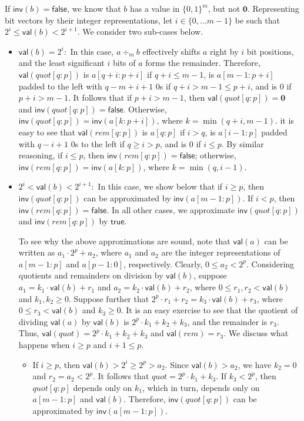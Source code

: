 \documentclass{llncs}
\newcommand{\val}{\ensuremath{\mathsf{val}}}
\newcommand{\inv}{\ensuremath{\mathsf{inv}}}
\newcommand{\true}{\ensuremath{\mathsf{true}}}
\newcommand{\false}{\ensuremath{\mathsf{false}}}
\begin{document}
If ${\inv}(b) = \false$, we know that $b$ has a value in $\{0,
1\}^{m}$, but not $\mathbf{0}$.  Representing bit vectors by their
integer representations, let $i \in \{0, \ldots m-1\}$ be such that
$2^i \le {\val}(b) < 2^{i+1}$.  We consider two
sub-cases below.
\begin{itemize}
\item ${\val}(b) = 2^i :$ In this case, $a \div_m b$ effectively
  shifts $a$ right by $i$ bit positions, and the least significant $i$
  bits of $a$ forms the remainder.
  Therefore, ${\val}(quot[q:p])$ is $a[q+i:p+i]$ if $q+i \le
  m-1$, is $a[m-1:p+i]$ padded to the left with $q-m+i+1$ $0$s if $q+i
  > m-1 \le p+i$, and is $0$ if $p+i > m-1$.
  It follows that if $p+i > m-1$, then ${\val}(quot[q:p]) = {\mathbf 0}$
  and ${\inv}(quot[q:p]) = \false$.  Otherwise, ${\inv}(quot[q:p]) =
  {\inv}(a[k:p+i])$, where $k = \min(q+i, m-1)$.
it is easy to see that ${\val}(rem[q:p])$ is
$a[q:p]$ if $i > q$, is $a[i-1:p]$ padded with $q-i+1$ $0$s to the
left if $q \ge i > p$, and is $0$ if $i \le p$.  
  By similar reasoning, if $i \le p$, then
${\inv}(rem[q:p]) = \false$;  otherwise, ${\inv}(rem[q:p]) =
{\inv}(a[k:p])$, where $k = \min(q, i-1)$.
\item $2^i < {\val}(b) < 2^{i+1} :$ In this case, we show below that
  if $i \ge p$, then ${\inv}(quot[q:p])$ can be approximated
  by ${\inv}(a[m-1:p])$.  If $i < p$, then ${\inv}(rem[q:p]) =
  \false$.  In all other cases, we approximate ${\inv}(quot[q:p])$ and
  ${\inv}(rem[q:p])$ by $\true$.

  To see why the above approximations are sound, note that
  ${\val}(a)$ can be written as $a_1\cdot 2^p + a_2$, where $a_1$ and
  $a_2$ are the integer representations of $a[m-1:p]$ and $a[p-1:0]$,
  respectively.  Clearly, $0 \le a_2 < 2^p$.  Considering quotients
  and remainders on division by ${\val}(b)$, suppose $a_1 = k_1\cdot
  {\val}(b) + r_1$ and $a_2 = k_2\cdot {\val}(b) + r_2$, where $0 \le
  r_1, r_2 < {\val}(b)$ and $k_1, k_2 \ge 0$.  Suppose further that
  $2^p\cdot r_1 + r_2 = k_3\cdot {\val}(b) + r_3$, where $0 \le r_3 <
  {\val}(b)$ and $k_3 \ge 0$.  It is an easy exercise to see that the
  quotient of dividing ${\val}(a)$ by ${\val}(b)$ is $2^p\cdot k_1 +
  k_2 + k_3$, and the remainder is $r_3$.  Thus, ${\val}(quot) =
  2^p\cdot k_1 + k_2 + k_3$ and ${\val}(rem) = r_3$.  We discuss what
  happens when $i \ge p$ and $i+1 \le p$.
  \begin{itemize}
    \item If $i \ge p$, then ${\val}(b) > 2^i \ge 2^p > a_2$.  Since
      ${\val}(b) > a_2$, we have $k_2 = 0$ and $r_2 = a_2 < 2^p$.  It
      follows that $quot = 2^p\cdot k_1 + k_3$.  If $k_3 < 2^p$, then
      $quot[q:p]$ depends only on $k_1$, which in turn, depends only
      on $a[m-1:p]$ and ${\val}(b)$.  Therefore, ${\inv}(quot[q:p])$
      can be approximated by ${\inv}(a[m-1:p])$.


\end{itemize}
\end{itemize}
\end{document}
